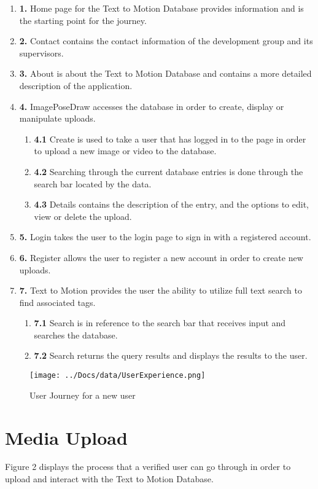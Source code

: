 \documentclass{scrreprt}
\begin{document}
\begin{enumerate}
  \item \textbf {1.} Home page for the Text to Motion Database provides information and is the starting point for the journey.
  \item \textbf {2.} Contact contains the contact information of the development group and its supervisors.
  \item \textbf {3.} About is about the Text to Motion Database and contains a more detailed description of the application.
  \item \textbf {4.} ImagePoseDraw accesses the database in order to create, display or manipulate uploads.
  \begin{enumerate}
    \item \textbf {4.1} Create is used to take a user that has logged in to the page in order to upload a new image or video to the database.
    \item \textbf {4.2} Searching through the current database entries is done through the search bar located by the data.
    \item \textbf {4.3} Details contains the description of the entry, and the options to edit, view or delete the upload.
  \end{enumerate}
  \item \textbf {5.} Login takes the user to the login page to sign in with a registered account.
  \item \textbf {6.} Register allows the user to register a new account in order to create new uploads.
  \item \textbf {7.} Text to Motion provides the user the ability to utilize full text search to find associated tags.
  \begin{enumerate}
    \item \textbf {7.1} Search is in reference to the search bar that receives input and searches the database.
    \item \textbf {7.2} Search returns the query results and displays the results to the user.
  \end{enumerate}
\end{enumerate}

\begin{figure}[!ht]
        \caption{User Journey for a new user}
        \label{erDiagram}
        \centering
        \texttt{[image: ../Docs/data/UserExperience.png]}
\end{figure}

\section{Media Upload}
Figure 2 displays the process that a verified user can go through in order to upload and interact with the Text to Motion Database.
\end{document}
